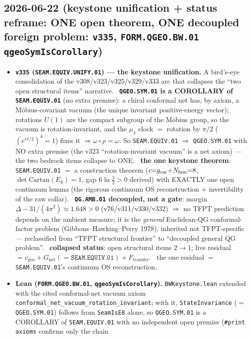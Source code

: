 \subsection*{2026-06-22 (keystone unification + status reframe: ONE open theorem, ONE decoupled foreign problem: \texttt{v335}, \texttt{FORM.QGEO.BW.01} \texttt{qgeoSymIsCorollary})}
\begin{itemize}
\item \textbf{\texttt{v335} (\texttt{SEAM.EQUIV.UNIFY.01}) --- the keystone unification.} A bird's-eye
consolidation of the v308/v323/v325/v329/v333 arc that collapses the ``two open structural items'' narrative.
\mE\ \textbf{\texttt{QGEO.SYM.01} is a COROLLARY of \texttt{SEAM.EQUIV.01}} (no extra premise): a chiral conformal
net has, by axiom, a M\"obius-covariant vacuum (the unique invariant positive-energy vector); rotations $U(1)$ are
the compact subgroup of the M\"obius group, so the vacuum is rotation-invariant, and the $\mu_4$ clock $=$ rotation
by $\pi/2$ ($(e^{i\pi/2})^4{=}1$) fixes it $\Rightarrow\omega\circ\rho{=}\omega$. So \texttt{SEAM.EQUIV.01}
$\Rightarrow$ \texttt{QGEO.SYM.01} with NO extra premise (the v323 ``rotation-invariant vacuum'' is a net axiom)
--- the two bedrock items collapse to ONE. \mE\ \textbf{the one keystone theorem}: \texttt{SEAM.EQUIV.01} $=$ a
construction theorem ($c{=}g_{\mathrm{car}}{+}N_{\mathrm{fam}}{=}8$, $\det\mathrm{Cartan}(E_8){=}1$, gap $6\ln\tfrac32>0$ derived) with
EXACTLY one open continuum lemma (the rigorous continuum OS reconstruction $+$ invertibility of the raw collar).
\mE\ \textbf{\texttt{QG.AMB.01} decoupled, not a gate}: margin $\Delta-31/(4\pi^2)\approx1.648>0$
(v76/v311/v330/v332) $\Rightarrow$ no TFPT prediction depends on the ambient measure; it is the \emph{general}
Euclidean-QG conformal-factor problem (Gibbons--Hawking--Perry 1978), inherited not TFPT-specific --- reclassified
from ``TFPT structural frontier'' to ``decoupled general QG problem''. \mE\ \textbf{collapsed status}: open
structural items $2\to1$; live residual $=v_{\mathrm{geo}}+G_{\mathrm{net}}({=}\texttt{SEAM.EQUIV.01})+
F_{\mathrm{transfer}}$. \mO\ the one residual $=$ \texttt{SEAM.EQUIV.01}'s continuum OS reconstruction.
\item \textbf{Lean (\texttt{FORM.QGEO.BW.01}, \texttt{qgeoSymIsCorollary}).} \texttt{BWKeystone.lean} extended with the
cited conformal-net vacuum axiom \texttt{conformal\_net\_vacuum\_rotation\_invariant}; with it,
\texttt{StateInvariance} ($=$\texttt{QGEO.SYM.01}) follows from \texttt{SeamIsE8} alone, so \texttt{QGEO.SYM.01} is a
COROLLARY of \texttt{SEAM.EQUIV.01} with no independent open premise (\texttt{\#print axioms} confirms only the chain

\end{itemize}
